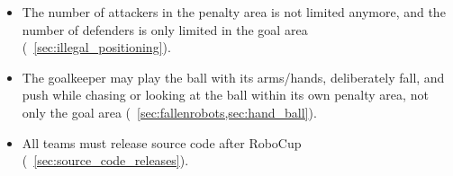 \begin{itemize}
  \item The number of attackers in the penalty area is not limited anymore, and the number of defenders is only limited in the goal area (\cf~\cref{sec:illegal_positioning}).
  \item The goalkeeper may play the ball with its arms/hands, deliberately fall, and push while chasing or looking at the ball within its own penalty area, not only the goal area (\cf~\cref{sec:fallenrobots,sec:hand_ball}).
  \item All teams must release source code after RoboCup (\cf~\cref{sec:source_code_releases}).
\end{itemize}
